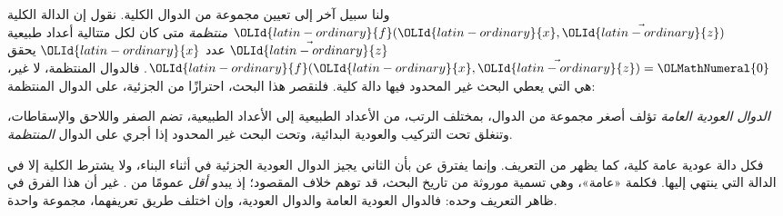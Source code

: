 \documentclass[../../../include/open-logic-section]{subfiles}
\begin{document}

ولنا سبيل آخر إلى تعيين مجموعة من الدوال الكلية. نقول إن الدالة الكلية
$\OLId{latin-ordinary}{f}(\OLId{latin-ordinary}{x},\vec \OLId{latin-ordinary}{z})$ \emph{منتظمة} متى كان لكل متتالية أعداد طبيعية
$\vec \OLId{latin-ordinary}{z}$ عدد $\OLId{latin-ordinary}{x}$ يحقق $\OLId{latin-ordinary}{f}(\OLId{latin-ordinary}{x},\vec \OLId{latin-ordinary}{z})=\OLMathNumeral{0}$. فالدوال المنتظمة، لا غير،
هي التي يعطي البحث غير المحدود فيها دالة
كلية. فلنقصر هذا البحث، احترازًا من الجزئية، على الدوال المنتظمة:

\begin{defn}
\emph{الدوال العودية العامة} تؤلف أصغر مجموعة من الدوال، بمختلف الرتب، من
الأعداد الطبيعية إلى الأعداد الطبيعية، تضم الصفر
واللاحق والإسقاطات، وتنغلق تحت التركيب والعودية البدائية، وتحت البحث
غير المحدود إذا أجري على الدوال \emph{المنتظمة}.
\end{defn}

فكل دالة عودية عامة كلية، كما يظهر من التعريف. وإنما يفترق
 عن  بأن
الثاني يجيز الدوال العودية الجزئية في أثناء البناء، ولا يشترط
الكلية إلا في الدالة التي ينتهي إليها. فكلمة «عامة»،
وهي تسمية موروثة من تاريخ البحث، قد توهم خلاف المقصود؛ إذ
 يبدو \emph{أقل} عمومًا من
. غير أن هذا الفرق في ظاهر التعريف وحده:
فالدوال العودية العامة والدوال العودية، وإن اختلف طريق تعريفهما،
مجموعة واحدة.
\end{document}
